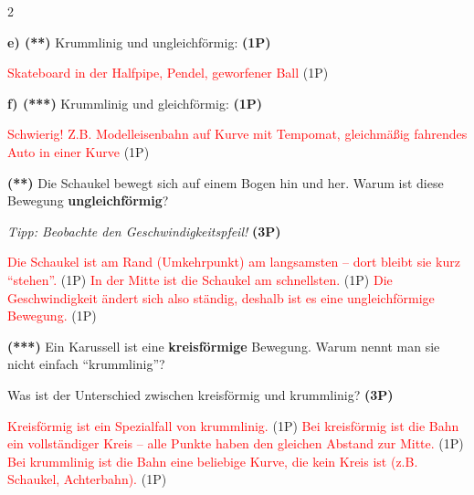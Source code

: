 \documentclass[11pt,a4paper]{article}
\begin{document}
\begin{multicols}{2}
\begin{tcolorbox}[title={5: Eigene Beispiele aus dem Alltag}]
\vspace{2mm}
\textbf{e) (**)} Krummlinig und ungleichförmig: \textbf{(1P)}

\textcolor{red}{Skateboard in der Halfpipe, Pendel, geworfener Ball} {\color{blue}(1P)}

\vspace{2mm}
\textbf{f) (***)} Krummlinig und gleichförmig: \textbf{(1P)}

\textcolor{red}{Schwierig! Z.B. Modelleisenbahn auf Kurve mit Tempomat, gleichmäßig fahrendes Auto in einer Kurve} {\color{blue}(1P)}
\end{tcolorbox}

\begin{tcolorbox}[title={6: Vertiefung Schaukel}]
\small
\textbf{(**)} Die Schaukel bewegt sich auf einem Bogen hin und her. Warum ist diese Bewegung \textbf{ungleichförmig}? 

\textit{Tipp: Beobachte den Geschwindigkeitspfeil!} \textbf{(3P)}

\textcolor{red}{Die Schaukel ist am Rand (Umkehrpunkt) am langsamsten -- dort bleibt sie kurz "`stehen"'.} {\color{blue}(1P)} \textcolor{red}{In der Mitte ist die Schaukel am schnellsten.} {\color{blue}(1P)} \textcolor{red}{Die Geschwindigkeit ändert sich also ständig, deshalb ist es eine ungleichförmige Bewegung.} {\color{blue}(1P)}
\end{tcolorbox}

\begin{tcolorbox}[title={7: Transferaufgabe}]
\small
\textbf{(***)} Ein Karussell ist eine \textbf{kreisförmige} Bewegung. Warum nennt man sie nicht einfach "`krummlinig"'? 

Was ist der Unterschied zwischen kreisförmig und krummlinig? \textbf{(3P)}

\textcolor{red}{Kreisförmig ist ein Spezialfall von krummlinig.} {\color{blue}(1P)} \textcolor{red}{Bei kreisförmig ist die Bahn ein vollständiger Kreis -- alle Punkte haben den gleichen Abstand zur Mitte.} {\color{blue}(1P)} \textcolor{red}{Bei krummlinig ist die Bahn eine beliebige Kurve, die kein Kreis ist (z.B. Schaukel, Achterbahn).} {\color{blue}(1P)}
\end{tcolorbox}

\end{multicols}
\end{document}
